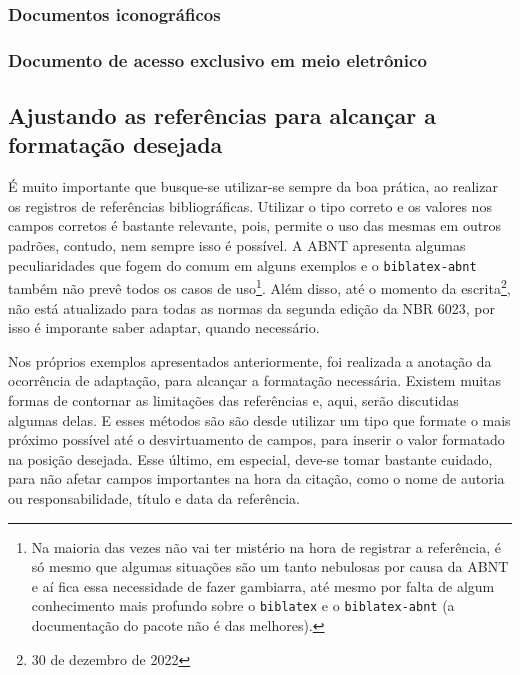 


\subsubsection{Documentos iconográficos}



\subsubsection{Documento de acesso exclusivo em meio eletrônico}





\subsection{Ajustando as referências para alcançar a formatação desejada}
É muito importante que busque-se utilizar-se sempre da boa prática, ao realizar os registros de referências bibliográficas. Utilizar o tipo correto e os valores nos campos corretos é bastante relevante, pois, permite o uso das mesmas em outros padrões, contudo, nem sempre isso é possível. A ABNT apresenta algumas peculiaridades que fogem do comum em alguns exemplos e o \texttt{biblatex-abnt} também não prevê todos os casos de uso\footnote{Na maioria das vezes não vai ter mistério na hora de registrar a referência, é só mesmo que algumas situações são um tanto nebulosas por causa da ABNT e aí fica essa necessidade de fazer gambiarra, até mesmo por falta de algum conhecimento mais profundo sobre o \texttt{biblatex} e o \texttt{biblatex-abnt} (a documentação do pacote não é das melhores).}. Além disso, até o momento da escrita\footnote{30 de dezembro de 2022}, não está atualizado para todas as normas da segunda edição da NBR 6023, por isso é imporante saber adaptar, quando necessário. 

Nos próprios exemplos apresentados anteriormente, foi realizada a anotação da ocorrência de adaptação, para alcançar a formatação necessária. Existem muitas formas de contornar as limitações das referências e, aqui, serão discutidas algumas delas. E esses métodos são são desde utilizar um tipo que formate o mais próximo possível até o desvirtuamento de campos, para inserir o valor formatado na posição desejada. Esse último, em especial, deve-se tomar bastante cuidado, para não afetar campos importantes na hora da citação, como o nome de autoria ou responsabilidade, título e data da referência.

